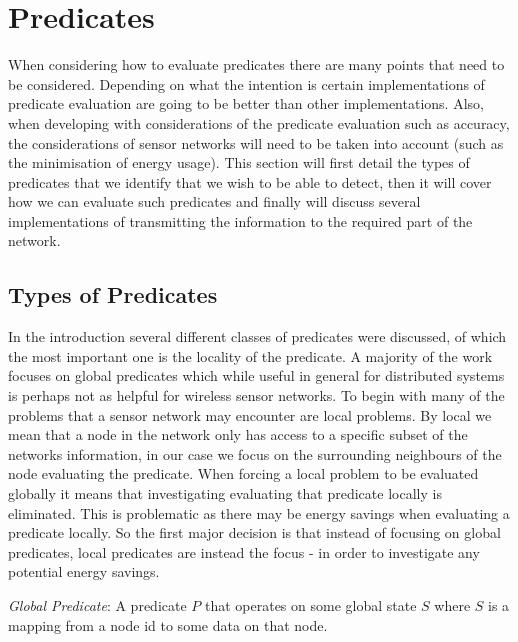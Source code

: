 
\section{Predicates}

When considering how to evaluate predicates there are many points that need to be considered. Depending on what the intention is certain implementations of predicate evaluation are going to be better than other implementations. Also, when developing with considerations of the predicate evaluation such as accuracy, the considerations of sensor networks will need to be taken into account (such as the minimisation of energy usage). This section will first detail the types of predicates that we identify that we wish to be able to detect, then it will cover how we can evaluate such predicates and finally will discuss several implementations of transmitting the information to the required part of the network.

\subsection{Types of Predicates}

In the introduction several different classes of predicates were discussed, of which the most important one is the locality of the predicate. A majority of the work focuses on global predicates \cite{277788,345831,553309} which while useful in general for distributed systems is perhaps not as helpful for wireless sensor networks. To begin with many of the problems that a sensor network may encounter are local problems. By local we mean that a node in the network only has access to a specific subset of the networks information, in our case we focus on the surrounding neighbours of the node evaluating the predicate. When forcing a local problem to be evaluated globally it means that investigating evaluating that predicate locally is eliminated. This is problematic as there may be energy savings when evaluating a predicate locally. So the first major decision is that instead of focusing on global predicates, local predicates are instead the focus - in order to investigate any potential energy savings.

\begin{mydef}
\emph{Global Predicate}: A predicate $P$ that operates on some global state $S$ where $S$ is a mapping from a node id to some data on that node.
\end{mydef}

